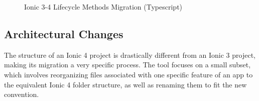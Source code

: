 \documentclass[conference]{IEEEtran}
\begin{document}
\begin{figure}
    \centering
    \qquad
    \caption{Ionic 3-4 Lifecycle Methods Migration (Typescript)}
    \label{fig:ionicLifecycleMigration}
\end{figure}

\subsection{Architectural Changes}
The structure of an Ionic 4 project is drastically different from an Ionic 3 project,
making its migration a very specific process. The tool focuses on a small subset, which
involves reorganizing files associated with one specific feature of an app to the equivalent Ionic 4
folder structure, as well as renaming them to fit the new convention.
\end{document}

